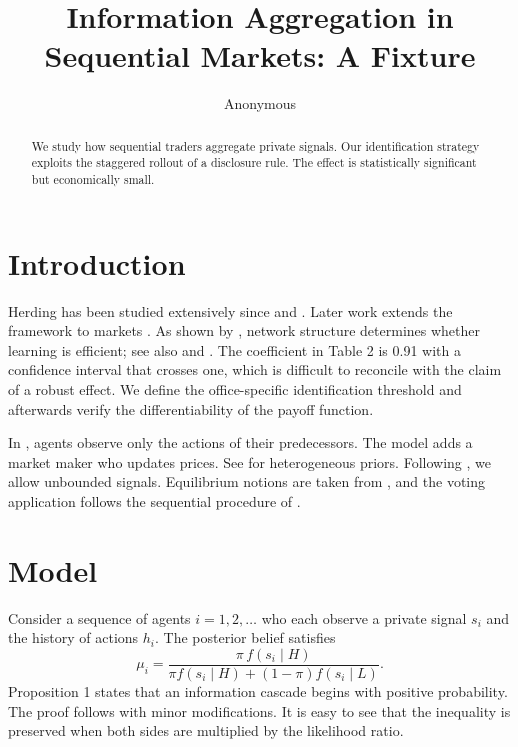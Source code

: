 \documentclass[12pt]{article}
\title{Information Aggregation in Sequential Markets: A Fixture}
\author{Anonymous}
\date{}
\begin{document}
\maketitle
\begin{abstract}
We study how sequential traders aggregate private signals. Our identification strategy exploits the staggered rollout of a disclosure rule. The effect is statistically significant but economically small.
\end{abstract}
\section{Introduction}
Herding has been studied extensively since \citet{banerjee1992} and \citet{bikhchandani1992}. Later work extends the framework to markets \citep{avery1998, smith2000}. As shown by \citet{acemoglu2011}, network structure determines whether learning is efficient; see also \citep[p.~12]{smith2000} and \citet{kogan2020,lee2021}. The coefficient in Table 2 is 0.91 with a confidence interval that crosses one, which is difficult to reconcile with the claim of a robust effect. We define the office-specific identification threshold and afterwards verify the differentiability of the payoff function.

In \citet{banerjee1992}, agents observe only the actions of their predecessors. The \citet{avery1998} model adds a market maker who updates prices. See \citet{lee2021} for heterogeneous priors. Following \citet{smith2000}, we allow unbounded signals. Equilibrium notions are taken from \citet{osborne1994}, and the voting application follows the sequential procedure of \citet{dekel2000}.

\section{Model}
Consider a sequence of agents $i = 1, 2, \ldots$ who each observe a private signal $s_i$ and the history of actions $h_i$. The posterior belief satisfies
\begin{equation}
\mu_i = \frac{\pi \, f(s_i \mid H)}{\pi f(s_i \mid H) + (1-\pi) f(s_i \mid L)} . \label{eq:posterior}
\end{equation}
Proposition 1 states that an information cascade begins with positive probability. The proof follows \citet{bikhchandani1992} with minor modifications. It is easy to see that the inequality is preserved when both sides are multiplied by the likelihood ratio.
\end{document}
